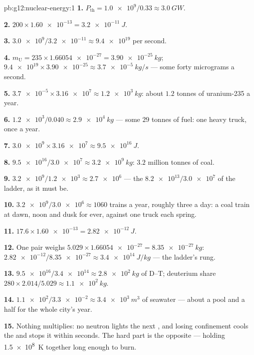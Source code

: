 \begin{solution}{pb:g12:nuclear-energy:1}
\textbf{1.} $P_{\text{th}} = \num{1.0e9}/0.33 \approx \qty{3.0}{GW}$.

\textbf{2.} $200 \times \num{1.60e-13} = \qty{3.2e-11}{J}$.

\textbf{3.} $\num{3.0e9}/\num{3.2e-11} \approx \num{9.4e19}$ 
per second.

\textbf{4.} $m_{\mathrm U} = 235 \times \num{1.66054e-27} =
\qty{3.90e-25}{kg}$; $\num{9.4e19} \times \num{3.90e-25} \approx
\qty{3.7e-5}{kg/s}$ --- some forty micrograms a second.

\textbf{5.} $\num{3.7e-5} \times \num{3.16e7} \approx \qty{1.2e3}{kg}$:
about $1.2$ tonnes of uranium-235 a year.

\textbf{6.} $\num{1.2e3}/0.040 \approx \qty{2.9e4}{kg}$ --- some $29$
tonnes of fuel: one heavy truck, once a year.

\textbf{7.} $\num{3.0e9} \times \num{3.16e7} \approx \qty{9.5e16}{J}$.

\textbf{8.} $\num{9.5e16}/\num{3.0e7} \approx \qty{3.2e9}{kg}$: $3.2$
million tonnes of coal.

\textbf{9.} $\num{3.2e9}/\num{1.2e3} \approx \num{2.7e6}$ --- the
$\num{8.2e13}/\num{3.0e7}$ of the ladder, as it must be.

\textbf{10.} $\num{3.2e9}/\num{3.0e6} \approx 1060$ trains a year,
roughly three a day: a coal train at dawn, noon and dusk for ever,
against one truck each spring.

\textbf{11.} $17.6 \times \num{1.60e-13} = \qty{2.82e-12}{J}$.

\textbf{12.} One pair weighs $5.029 \times \num{1.66054e-27} =
\qty{8.35e-27}{kg}$: $\num{2.82e-12}/\num{8.35e-27} \approx
\qty{3.4e14}{J/kg}$ --- the ladder's  rung.

\textbf{13.} $\num{9.5e16}/\num{3.4e14} \approx \qty{2.8e2}{kg}$ of
D--T; deuterium share $280 \times 2.014/5.029 \approx \qty{1.1e2}{kg}$.

\textbf{14.} $\num{1.1e2}/\num{3.3e-2} \approx \qty{3.4e3}{m^3}$ of
seawater --- about a pool and a half for the whole city's year.

\textbf{15.} Nothing multiplies: no neutron lights the next ,
and losing confinement cools the  and stops it within seconds.
The hard part is the opposite --- holding \qty{1.5e8}{K} together long
enough to burn.


\end{solution}

